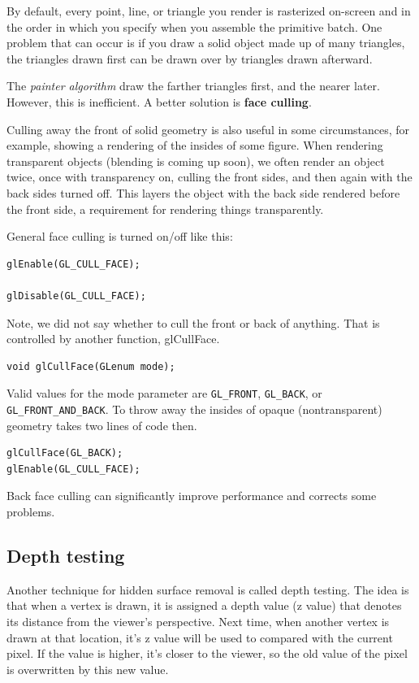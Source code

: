 By default, every point, line, or triangle you render is rasterized
on-screen and in the order in which you specify when you assemble the
primitive batch. One problem that can occur is if you draw a solid
object made up of many triangles, the triangles drawn first can be
drawn over by triangles drawn afterward. 

The {\it painter algorithm} draw the farther triangles first, and the
nearer later. However, this is inefficient. A better solution is {\bf
  face culling}. 

Culling away the front of solid geometry is also useful in some
circumstances, for example, showing a rendering of the insides of some
figure. When rendering transparent objects (blending is coming up
soon), we often render an object twice, once with transparency on,
culling the front sides, and then again with the back sides turned
off. This layers the object with the back side rendered before the
front side, a requirement for rendering things transparently.

General face culling is turned on/off like this:
\begin{verbatim}
glEnable(GL_CULL_FACE);

glDisable(GL_CULL_FACE);
\end{verbatim}

Note, we did not say whether to cull the front or back of
anything. That is controlled by another function, glCullFace.
\begin{verbatim}
void glCullFace(GLenum mode);
\end{verbatim}
Valid values for the mode parameter are \verb!GL_FRONT!,
\verb!GL_BACK!, or \verb!GL_FRONT_AND_BACK!. To throw away the insides
of opaque (nontransparent) geometry takes two lines of code then.
\begin{verbatim}
glCullFace(GL_BACK);
glEnable(GL_CULL_FACE);
\end{verbatim}
Back face culling can significantly improve performance and corrects
some problems.

\subsection{Depth testing}
\label{sec:depth-testing}

Another technique for hidden surface removal is called depth
testing. The idea is that when a vertex is drawn, it is assigned a
depth value (z value) that denotes its distance from the viewer's
perspective. Next time, when another vertex is drawn at that location,
it's z value will be used to compared with the current pixel. If the
value is higher, it's closer to the viewer, so the old value of the
pixel is overwritten by this new value. 

